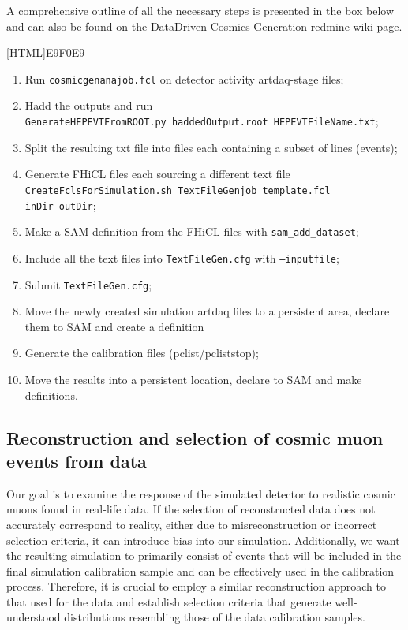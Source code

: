 \documentclass[12pt]{article}
\begin{document}
A comprehensive outline of all the necessary steps is presented in the box below and can also be found on the \href{https://cdcvs.fnal.gov/redmine/projects/novaart/wiki/DataDriven\_Cosmics}{DataDriven Cosmics Generation redmine wiki page}.

\vspace{5mm}
[HTML]{E9F0E9}{
\parbox{.9\textwidth}{
\begin{enumerate}
\item Run \texttt{cosmicgenanajob.fcl} on detector activity artdaq-stage files;
\item Hadd the outputs and run\\\texttt{GenerateHEPEVTFromROOT.py haddedOutput.root HEPEVTFileName.txt};
\item Split the resulting txt file into files each containing a subset of lines (events);
\item Generate FHiCL files each sourcing a different text file \\\texttt{CreateFclsForSimulation.sh TextFileGenjob\_template.fcl}\\ \hspace*{58mm}\texttt{inDir outDir};
\item Make a SAM definition from the FHiCL files with \texttt{sam\_add\_dataset};
\item Include all the text files into \texttt{TextFileGen.cfg} with \texttt{--inputfile};
\item Submit \texttt{TextFileGen.cfg};
\item Move the newly created simulation artdaq files to a persistent area, declare them to SAM and create a definition 
\item Generate the calibration files (pclist/pcliststop);
\item Move the results into a persistent location, declare to SAM and make definitions.
\end{enumerate}
}}

\subsection{Reconstruction and selection of cosmic muon events from data}\label{secCosmicGenAna}

Our goal is to examine the response of the simulated detector to realistic cosmic muons found in real-life data. If the selection of reconstructed data does not accurately correspond to reality, either due to misreconstruction or incorrect selection criteria, it can introduce bias into our simulation. Additionally, we want the resulting simulation to primarily consist of events that will be included in the final simulation calibration sample and can be effectively used in the calibration process. Therefore, it is crucial to employ a similar reconstruction approach to that used for the data and establish selection criteria that generate well-understood distributions resembling those of the data calibration samples.
\end{document}
